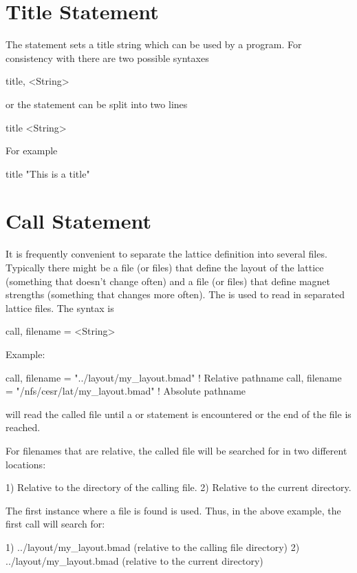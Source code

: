 {{%
\section{Title Statement}

The  statement sets a title string which can be used by a program. 
For consistency with \mad there are two possible syntaxes
\begin{example}
  title, <String>
\end{example}
or the statement can be split into two lines
\begin{example}
  title
  <String>
\end{example}
For example
\begin{example}
  title
  "This is a title"
\end{example}

\section{Call Statement}
\label{s:call}

It is frequently convenient to separate the lattice definition into
several files.  Typically there might be a file (or files) that define
the layout of the lattice (something that doesn't change often) and a
file (or files) that define magnet strengths (something that changes
more often).  The  is used to read in separated lattice
files. The syntax is
\begin{example}
  call, filename = <String>
\end{example}
Example:
\begin{example}
  call, filename = "../layout/my_layout.bmad"      ! Relative pathname
  call, filename = "/nfs/cesr/lat/my_layout.bmad"  ! Absolute pathname
\end{example}
\bmad will read the called file until a  or 
statement is encountered or the end of the file is reached.

For filenames that are relative, the called file will be searched for in
two different locations:
\begin{example}
  1) Relative to the directory of the calling file.
  2) Relative to the current directory.
\end{example}
The first instance where a file is found is used.
Thus, in the above example, the first call will search for:
\begin{example}
  1) ../layout/my_layout.bmad  (relative to the calling file directory)
  2) ../layout/my_layout.bmad  (relative to the current directory)
\end{example}

}}
